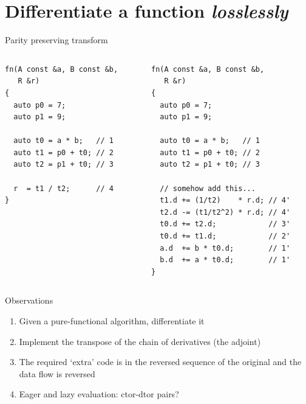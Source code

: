 \documentclass[xcolor=dvipsnames]{beamer}
\begin{document}
\section{Differentiate a function \protect\textit{losslessly}}

\begin{frame}[fragile]{Parity preserving transform}
  \begin{columns}[T] %
    \begin{column}{0.44\textwidth}
      {\color{gray}{write something like this \dots}}
      \begin{lstlisting}
fn(A const &a, B const &b,
   R &r)
{
  auto p0 = 7;
  auto p1 = 9;

  auto t0 = a * b;   // 1
  auto t1 = p0 + t0; // 2
  auto t2 = p1 + t0; // 3

  r  = t1 / t2;      // 4
}
  \end{lstlisting}
    \end{column}%
    \hfill%
    \begin{column}{0.56\textwidth}
      {\color{gray}{to implement something like this}}
        \begin{lstlisting}
fn(A const &a, B const &b,
   R &r)
{
  auto p0 = 7;
  auto p1 = 9;

  auto t0 = a * b;   // 1
  auto t1 = p0 + t0; // 2
  auto t2 = p1 + t0; // 3

  // somehow add this...
  t1.d += (1/t2)    * r.d; // 4'
  t2.d -= (t1/t2^2) * r.d; // 4'
  t0.d += t2.d;            // 3'
  t0.d += t1.d;            // 2'
  a.d  += b * t0.d;        // 1'
  b.d  += a * t0.d;        // 1'
}
  \end{lstlisting}
    \end{column}%
  \end{columns}
\end{frame}


\begin{frame}[fragile]{Observations}
  \begin{enumerate}
  \item Given a pure-functional algorithm, differentiate it \vspace{5mm}
  \item Implement the transpose of the chain of derivatives (the adjoint) \vspace{5mm}
  \item The required `extra' code is in the reversed sequence of the original and the data flow is reversed \vspace{5mm}
  \item Eager and lazy evaluation: ctor-dtor pairs? \vspace{5mm}
  \end{enumerate}
\end{frame}
\end{document}
